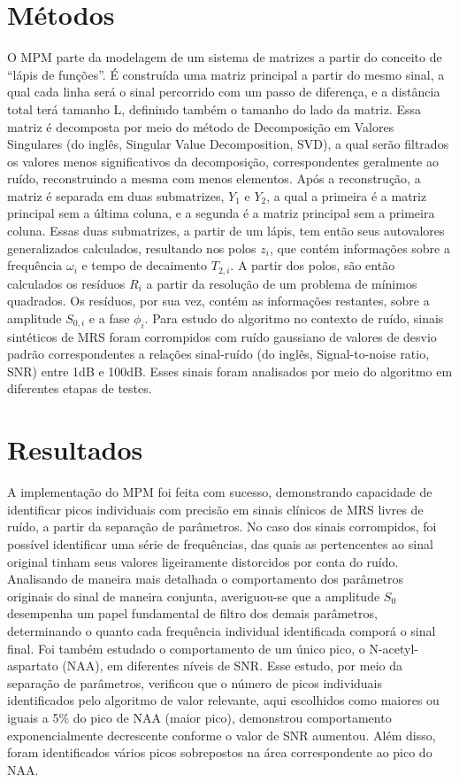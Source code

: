 \documentclass[12pt]{article}
\begin{document}
\section{Métodos} 
O MPM parte da modelagem de um sistema de matrizes a partir do conceito de “lápis de funções”. É construída uma matriz principal 
a partir do mesmo sinal, a qual cada linha será o sinal percorrido com um passo de diferença, e a distância total terá tamanho 
L, definindo também o tamanho do lado da matriz. Essa matriz é decomposta por meio do método de Decomposição em Valores Singulares 
(do inglês, Singular Value Decomposition, SVD), a qual serão filtrados os valores menos significativos da decomposição, correspondentes 
geralmente ao ruído, reconstruindo a mesma com menos elementos. Após a reconstrução, a matriz é separada em duas submatrizes, $Y_1$ e 
$Y_2$, a qual a primeira é a matriz principal sem a última coluna, e a segunda é a matriz principal sem a primeira coluna. Essas duas 
submatrizes, a partir de um lápis, tem então seus autovalores generalizados calculados, resultando nos polos $z_i$, que contém informações 
sobre a frequência $\omega_i$ e tempo de decaimento $T_{2, i}$. A partir dos polos, são então calculados os resíduos $R_i$ a partir da 
resolução de um problema de mínimos quadrados. Os resíduos, por sua vez, contém as informações restantes, sobre a amplitude $S_{0, i}$ 
e a fase $\phi_i$. Para estudo do algoritmo no contexto de ruído, sinais sintéticos de MRS foram corrompidos com ruído gaussiano de 
valores de desvio padrão correspondentes a relações sinal-ruído (do inglês, Signal-to-noise ratio, SNR) entre 1dB e 100dB. Esses 
sinais foram analisados por meio do algoritmo em diferentes etapas de testes.

\section{Resultados}
A implementação do MPM foi feita com sucesso, demonstrando capacidade de identificar picos individuais com precisão em sinais 
clínicos de MRS livres de ruído, a partir da separação de parâmetros. No caso dos sinais corrompidos, foi possível identificar 
uma série de frequências, das quais as pertencentes ao sinal original tinham seus valores ligeiramente distorcidos por conta do 
ruído. Analisando de maneira mais detalhada o comportamento dos parâmetros originais do sinal de maneira conjunta, averiguou-se 
que a amplitude $S_0$ desempenha um papel fundamental de filtro dos demais parâmetros, determinando o quanto cada frequência individual 
identificada comporá o sinal final. Foi também estudado o comportamento de um único pico, o N-acetyl-aspartato (NAA), em diferentes 
níveis de SNR. Esse estudo, por meio da separação de parâmetros, verificou que o número de picos individuais identificados pelo 
algoritmo de valor relevante, aqui escolhidos como maiores ou iguais a 5\% do pico de NAA (maior pico), demonstrou comportamento 
exponencialmente decrescente conforme o valor de SNR aumentou. Além disso, foram identificados vários picos sobrepostos na área 
correspondente ao pico do NAA.
\end{document}
